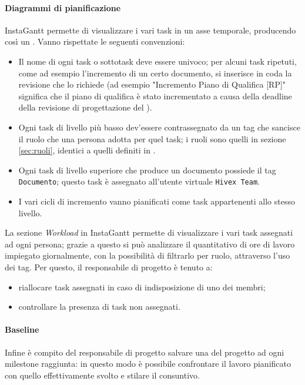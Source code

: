 \paragraph{Diagrammi di pianificazione}
InstaGantt permette di visualizzare i vari task in un asse temporale, producendo così un . 
Vanno rispettate le seguenti convenzioni:
\begin{itemize}
	\item Il nome di ogni task o sottotask deve essere univoco; per alcuni task ripetuti, come ad esempio l'incremento di un certo documento, si inserisce in coda la revisione che lo richiede (ad esempio "Incremento Piano di Qualifica [RP]" significa che il piano di qualifica è stato incrementato a causa della deadline della revisione di progettazione del \TV).
	\item Ogni task di livello più basso dev'essere contrassegnato da un tag che sancisce il ruolo che una persona adotta per quel task; i ruoli sono quelli in sezione \ref{sec:ruoli}, identici a quelli definiti in \PdP.
	\item Ogni task di livello superiore che produce un documento possiede il tag \texttt{Documento}; questo task è assegnato all'utente virtuale \texttt{Hivex Team}.
	\item I vari cicli di incremento vanno pianificati come task appartenenti allo stesso livello.
\end{itemize}
La sezione \emph{Workload} in InstaGantt permette di visualizzare i vari task assegnati ad ogni persona; grazie a questo si può analizzare il quantitativo di ore di lavoro impiegato giornalmente, con la possibilità di filtrarlo per ruolo, attraverso l'uso dei tag. Per questo, il responsabile di progetto è tenuto a:
\begin{itemize}
	\item riallocare task assegnati in caso di indisposizione di uno dei membri;
	\item controllare la presenza di task non assegnati.
\end{itemize}

\paragraph{Baseline} Infine è compito del responsabile di progetto salvare una \emph{} del progetto ad ogni milestone raggiunta: in questo modo è possibile confrontare il lavoro pianificato con quello effettivamente svolto e stilare il consuntivo.

